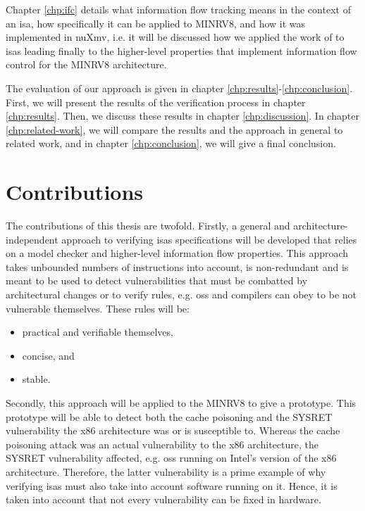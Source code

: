 Chapter \ref{chp:ifc} details what information flow tracking means in the context of an \gls{isa}, how specifically it can be applied to MINRV8, and how it was implemented in nuXmv, i.e. it will be discussed how we applied the work of \citeauthor{Ferraiuolo17} \cite{Ferraiuolo17} to \glspl{isa} leading finally to the higher-level properties that implement information flow control for the MINRV8 architecture.

The evaluation of our approach is given in chapter \ref{chp:results}-\ref{chp:conclusion}.
First, we will present the results of the verification process in chapter \ref{chp:results}.
Then, we discuss these results in chapter \ref{chp:discussion}.
In chapter \ref{chp:related-work}, we will compare the results and the approach in general to related work, and in chapter \ref{chp:conclusion}, we will give a final conclusion.

\section{Contributions}

The contributions of this thesis are twofold.
Firstly, a general and architecture-independent approach to verifying \glspl{isa} specifications will be developed that relies on a model checker and higher-level information flow properties.
This approach takes unbounded numbers of instructions into account, is non-redundant and is meant to be used to detect vulnerabilities that must be combatted by architectural changes or to verify rules, e.g. \glspl{os} and compilers can obey to be not vulnerable themselves.
These rules will be:
\begin{itemize}
    \item practical and verifiable themselves,
    \item concise, and
    \item stable.
\end{itemize}

Secondly, this approach will be applied to the MINRV8 to give a prototype.
This prototype will be able to detect both the cache poisoning and the SYSRET vulnerability the x86 architecture was or is susceptible to.
Whereas the cache poisoning attack was an actual vulnerability to the x86 architecture, the SYSRET vulnerability affected, e.g. \glspl{os} running on Intel's version of the x86 architecture.
Therefore, the latter vulnerability is a prime example of why verifying \glspl{isa} must also take into account software running on it.
Hence, it is taken into account that not every vulnerability can be fixed in hardware.
